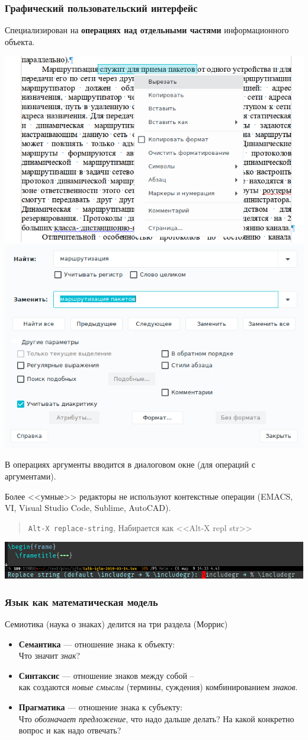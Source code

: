 \documentclass[10pt]{beamer}
\begin{document}
\begin{frame}
  \frametitle{Графический пользовательский интерфейс}
  Специализирован на \textbf{операциях над отдельными частями} информационного объекта.
  \begin{center}
    \includegraphics[width=0.4\linewidth]{pics/shot-context-menu.png}\qquad
    \includegraphics[width=0.4\linewidth]{pics/shot-replace.png}
  \end{center}
  В операциях аргументы вводится в диалоговом окне (для операций с аргументами).

  Более <<умные>> редакторы не используют контекстные операции (EMACS, VI, Visual Studio Code, Sublime, AutoCAD).
\begin{quote}
  \texttt{Alt-X replace-string}, Набирается как <<Alt-X repl str>>
\end{quote}
\begin{center}
    \includegraphics[width=0.9\linewidth]{pics/shot-replace-string-emacs.png}\qquad
  \end{center}
\end{frame}

\begin{frame}
  \frametitle{Язык как математическая модель}
  \begin{block}{Семиотика (наука о знаках) делится на три раздела (Моррис)}
  \begin{itemize}
  \item \textbf{Семантика} — отношение знака к объекту: \\ Что значит \emph{знак}?
  \item \textbf{Синтаксис} — отношение знаков между собой --\\ как создаются \emph{новые смыслы} (термины, суждения) комбинированием \emph{знаков}.
  \item \textbf{Прагматика} — отношение знака к субъекту:\\ Что \emph{обозначает предложение}, что надо дальше делать? На какой конкретно вопрос и как надо отвечать?
  \end{itemize}
\end{block}
\end{frame}
\end{document}
